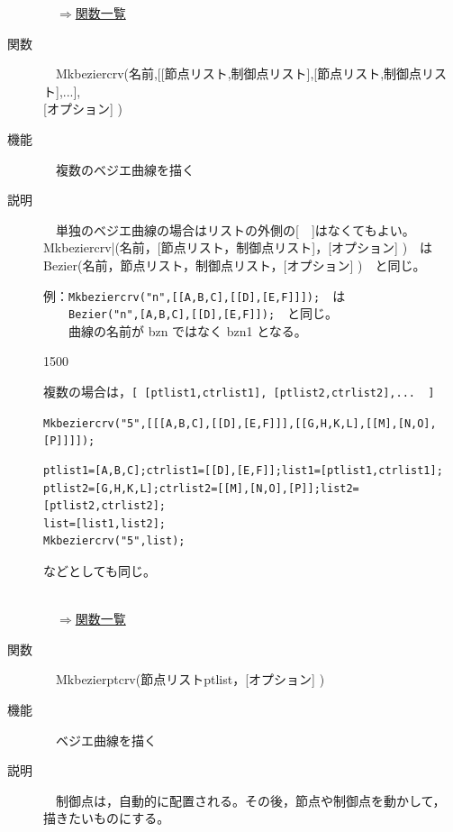 \documentclass[papersize,a4paper,12pt,uplatex]{jsarticle}
\begin{document}
\begin{description}
\begin{flushright}　\hyperlink{functionlist}{$\Rightarrow$関数一覧}\end{flushright}

\hypertarget{mkbeziercrv}{}
\item[関数]　Mkbeziercrv(名前,[[節点リスト,制御点リスト],[節点リスト,制御点リスト],...],\\
\hfill[オプション] )
\item[機能]　複数のベジエ曲線を描く
\item[説明]　単独のベジエ曲線の場合はリストの外側の[　]はなくてもよい。\\
Mkbeziercrv|(名前，[節点リスト，制御点リスト]，[オプション] )　は\\
Bezier(名前，節点リスト，制御点リスト，[オプション] )　と同じ。


\vspace{2mm}

例：\verb|Mkbeziercrv("n",[[A,B,C],[[D],[E,F]]]);|　は\\
　　\verb|Bezier("n",[A,B,C],[[D],[E,F]]);|　と同じ。\\
　　曲線の名前が bzn ではなく bzn1 となる。

\vspace{2mm}

\begin{layer}{150}{0}
\end{layer}

複数の場合は，\verb|[ [ptlist1,ctrlist1], [ptlist2,ctrlist2],...  ]|

\verb|Mkbeziercrv("5",[[[A,B,C],[[D],[E,F]]],[[G,H,K,L],[[M],[N,O],[P]]]]);|

\vspace{40mm}
\begin{verbatim}
ptlist1=[A,B,C];ctrlist1=[[D],[E,F]];list1=[ptlist1,ctrlist1];
ptlist2=[G,H,K,L];ctrlist2=[[M],[N,O],[P]];list2=[ptlist2,ctrlist2];
list=[list1,list2];
Mkbeziercrv("5",list);
\end{verbatim}
などとしても同じ。
　\\
　\\
\begin{flushright}　\hyperlink{functionlist}{$\Rightarrow$関数一覧}\end{flushright}

\hypertarget{mkbezierptcrv}{}
\item[関数]　Mkbezierptcrv(節点リストptlist，[オプション] )
\item[機能]　ベジエ曲線を描く
\item[説明]　制御点は，自動的に配置される。その後，節点や制御点を動かして，
描きたいものにする。


\end{description}
\end{document}
